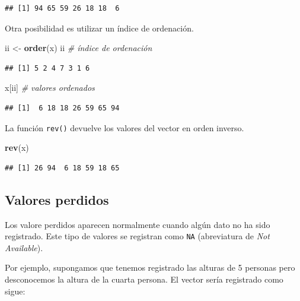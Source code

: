\documentclass[]{book}
\newenvironment{Shaded}{\begin{snugshade}}{\end{snugshade}}
\newcommand{\CommentTok}[1]{\textcolor[rgb]{0.56,0.35,0.01}{\textit{#1}}}
\newcommand{\KeywordTok}[1]{\textcolor[rgb]{0.13,0.29,0.53}{\textbf{#1}}}
\newcommand{\NormalTok}[1]{#1}
\newcommand{\StringTok}[1]{\textcolor[rgb]{0.31,0.60,0.02}{#1}}
\begin{document}
\begin{verbatim}
## [1] 94 65 59 26 18 18  6
\end{verbatim}

Otra posibilidad es utilizar un índice de ordenación.

\begin{Shaded}
\begin{Highlighting}[]
\NormalTok{ii <-}\StringTok{ }\KeywordTok{order}\NormalTok{(x)}
\NormalTok{ii  }\CommentTok{# índice de ordenación}
\end{Highlighting}
\end{Shaded}

\begin{verbatim}
## [1] 5 2 4 7 3 1 6
\end{verbatim}

\begin{Shaded}
\begin{Highlighting}[]
\NormalTok{x[ii]  }\CommentTok{# valores ordenados}
\end{Highlighting}
\end{Shaded}

\begin{verbatim}
## [1]  6 18 18 26 59 65 94
\end{verbatim}

La función \texttt{rev()} devuelve los valores del vector en orden inverso.

\begin{Shaded}
\begin{Highlighting}[]
\KeywordTok{rev}\NormalTok{(x)}
\end{Highlighting}
\end{Shaded}

\begin{verbatim}
## [1] 26 94  6 18 59 18 65
\end{verbatim}

\hypertarget{valores-perdidos}{%
\subsection{Valores perdidos}\label{valores-perdidos}}

Los valore perdidos aparecen normalmente cuando algún dato no ha sido registrado. Este tipo de
valores se registran como \texttt{NA} (abreviatura de \emph{Not Available}).

Por ejemplo, supongamos que tenemos registrado las alturas de 5 personas
pero desconocemos la altura de la cuarta persona. El vector sería
registrado como sigue:
\end{document}
